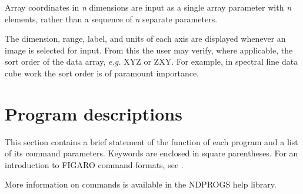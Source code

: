Array coordinates in {\it n} dimensions are input as a single array
parameter with {\it n} elements, rather than a sequence of {\it n}
separate parameters.

The dimension, range, label, and units of each axis are displayed
whenever an image is selected for input. From this the user may verify,
where applicable, the sort order of the data array, {\it e.g.} XYZ or
ZXY. For example, in spectral line data cube work the sort order is of
paramount importance.

\section{Program descriptions{}}
\label{sec:program}

This section contains a brief statement of the function of each program
and a list of its command parameters. Keywords are enclosed in square
parentheses.  For an introduction to FIGARO command formats, see .

More information on commands is available in the NDPROGS help library.

